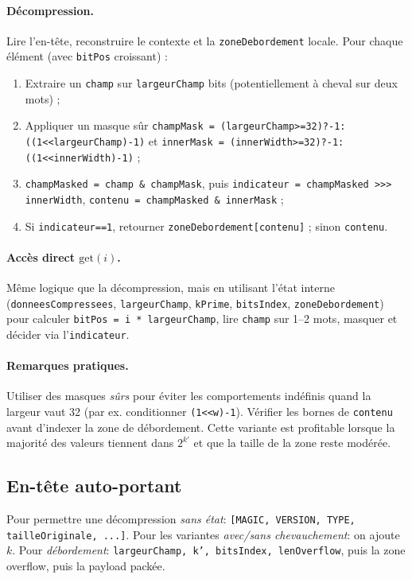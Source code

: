 \paragraph{Décompression.}
Lire l'en-tête, reconstruire le contexte et la \verb|zoneDebordement| locale. Pour chaque élément (avec \verb|bitPos| croissant) :
\begin{enumerate}
  \item Extraire un \verb|champ| sur \verb|largeurChamp| bits (potentiellement à cheval sur deux mots) ;
  \item Appliquer un masque sûr \verb|champMask = (largeurChamp>=32)?-1:((1<<largeurChamp)-1)| et \verb|innerMask = (innerWidth>=32)?-1:((1<<innerWidth)-1)| ;
  \item \verb|champMasked = champ & champMask|, puis \verb|indicateur = champMasked >>> innerWidth|, \verb|contenu = champMasked & innerMask| ;
  \item Si \verb|indicateur==1|, retourner \verb|zoneDebordement[contenu]| ; sinon \verb|contenu|.
\end{enumerate}

\paragraph{Accès direct $\mathrm{get}(i)$.}
Même logique que la décompression, mais en utilisant l'état interne (\verb|donneesCompressees|, \verb|largeurChamp|, \verb|kPrime|, \verb|bitsIndex|, \verb|zoneDebordement|) pour calculer \verb|bitPos = i * largeurChamp|, lire \verb|champ| sur 1–2 mots, masquer et décider via l'\verb|indicateur|.

\paragraph{Remarques pratiques.}
Utiliser des masques \emph{sûrs} pour éviter les comportements indéfinis quand la largeur vaut 32 (par ex. conditionner \verb|(1<<w)-1|). Vérifier les bornes de \verb|contenu| avant d'indexer la zone de débordement. Cette variante est profitable lorsque la majorité des valeurs tiennent dans $2^{k'}$ et que la taille de la zone reste modérée.

\subsection{En-tête auto-portant}
Pour permettre une décompression \emph{sans état}: \texttt{[MAGIC, VERSION, TYPE, tailleOriginale, ...]}. Pour les variantes \emph{avec/sans chevauchement}: on ajoute $k$. Pour \emph{débordement}: \texttt{largeurChamp, k', bitsIndex, lenOverflow}, puis la zone overflow, puis la payload packée.

